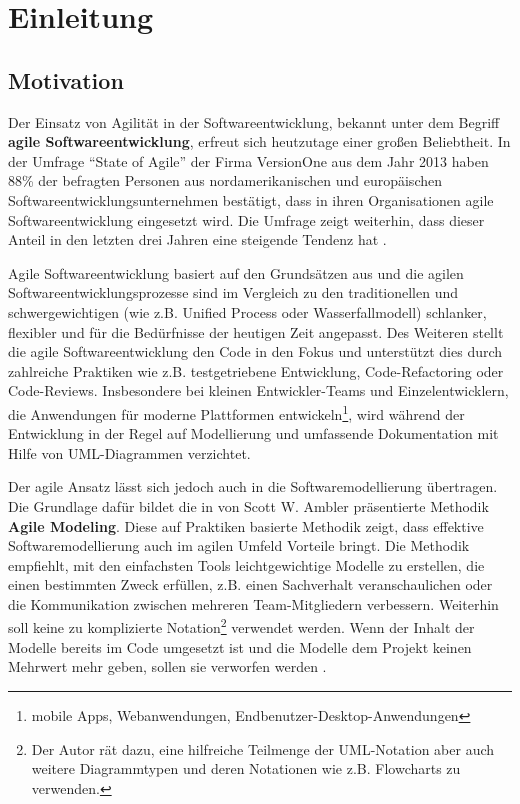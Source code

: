
\chapter{Einleitung}
\label{chapter:introduction}

\section{Motivation}

Der Einsatz von Agilität in der Softwareentwicklung, bekannt unter dem Begriff \textbf{agile Softwareentwicklung}, erfreut sich heutzutage einer großen Beliebtheit. In der Umfrage \enquote{State of Agile} der Firma VersionOne aus dem Jahr 2013 haben 88\% der befragten Personen aus nordamerikanischen und europäischen Softwareentwicklungsunternehmen bestätigt, dass in ihren Organisationen agile Softwareentwicklung eingesetzt wird. Die Umfrage zeigt weiterhin, dass dieser Anteil in den letzten drei Jahren eine steigende Tendenz hat \cite{VersionOne148th-Annual}.

Agile Softwareentwicklung basiert auf den Grundsätzen aus \cite{BeckBeedle01Manifest} und die agilen Softwareentwicklungsprozesse sind im Vergleich zu den traditionellen und schwergewichtigen (wie z.B. Unified Process oder Wasserfallmodell) schlanker, flexibler und für die Bedürfnisse der heutigen Zeit angepasst. Des Weiteren stellt die agile Softwareentwicklung den Code in den Fokus und unterstützt dies durch zahlreiche Praktiken wie z.B. testgetriebene Entwicklung, Code-Refactoring oder Code-Reviews. Insbesondere bei kleinen Entwickler-Teams und Einzelentwicklern, die Anwendungen für moderne Plattformen entwickeln\footnote{mobile Apps, Webanwendungen, Endbenutzer-Desktop-Anwendungen}, wird während der Entwicklung in der Regel auf Modellierung und umfassende Dokumentation mit Hilfe von UML-Dia\-gram\-men verzichtet.

Der agile Ansatz lässt sich jedoch auch in die Softwaremodellierung übertragen. Die Grundlage dafür bildet die in \cite{Ambler02Agile} von Scott W. Ambler präsentierte Methodik \textbf{Agile Modeling}. Diese auf Praktiken basierte Methodik zeigt, dass effektive Softwaremodellierung auch im agilen Umfeld Vorteile bringt. Die Methodik empfiehlt, mit den einfachsten Tools leichtgewichtige Modelle zu erstellen, die einen bestimmten Zweck erfüllen, z.B. einen Sachverhalt  veranschaulichen oder die Kommunikation zwischen mehreren Team-Mitgliedern verbessern. Weiterhin soll keine zu komplizierte Notation\footnote{Der Autor rät dazu, eine hilfreiche Teilmenge der UML-Notation aber auch weitere Diagrammtypen und deren Notationen wie z.B. Flowcharts zu verwenden.} verwendet werden. Wenn der Inhalt der Modelle bereits im Code umgesetzt ist und die Modelle dem Projekt keinen Mehrwert mehr geben, sollen sie verworfen werden \cite{Ambler02Agile}.

